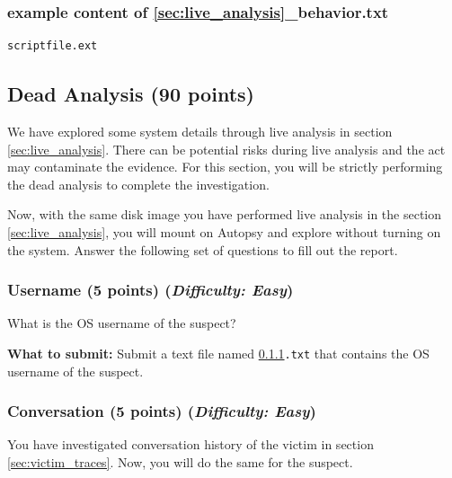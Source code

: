\documentclass[letterpaper,12pt]{report}
\begin{document}
\subsubsection*{example content of {\ref{sec:live_analysis}\_behavior.txt}}
\begin{mdframed}
\begin{Verbatim}
scriptfile.ext
\end{Verbatim}
\end{mdframed}


\subsection{Dead Analysis (90 points)}
\label{sec:suspect_traces}
We have explored some system details through live analysis in section \ref{sec:live_analysis}. There can be potential risks during live analysis and the act may contaminate the evidence. For this section, you will be strictly performing the dead analysis to complete the investigation.

\medskip
Now, with the same disk image you have performed live analysis in the section \ref{sec:live_analysis}, you will mount on Autopsy and explore without turning on the system. Answer the following set of questions to fill out the report.

\subsubsection{Username (5 points)    \hfill\rm\normalsize (\emph{Difficulty: Easy})}
\label{sec:username_suspect}
What is the OS username of the suspect?

\medskip 
\textbf{What to submit:} Submit a text file named \texttt{\ref{sec:username_suspect}.txt} that contains the OS username of the suspect.

\subsubsection{Conversation (5 points)    \hfill\rm\normalsize (\emph{Difficulty: Easy})}
\label{sec:conversation_suspect}
You have investigated conversation history of the victim in section \ref{sec:victim_traces}. Now, you will do the same for the suspect.
\end{document}
